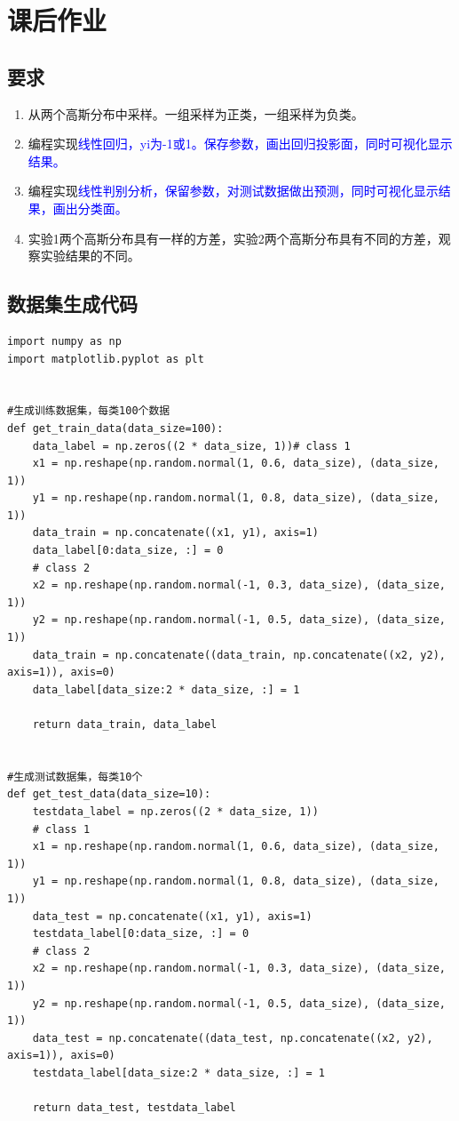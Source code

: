 \documentclass{article}
\date{\today}
\begin{document}
\section*{课后作业} %
\label{sec:课后作业}
\subsection*{要求} %
\label{sub:要求}
	\begin{enumerate}
		\item 从两个高斯分布中采样。一组采样为正类，一组采样为负类。
		\item 编程实现\textcolor{blue}{线性回归，yi为-1或1。保存参数，画出回归投影面，同时可视化显示结果。}
		\item 编程实现\textcolor{blue}{线性判别分析，保留参数，对测试数据做出预测，同时可视化显示结果，画出分类面。}
		\item 实验1两个高斯分布具有一样的方差，实验2两个高斯分布具有不同的方差，观察实验结果的不同。
	\end{enumerate}
\subsection*{数据集生成代码} %
\label{sub:数据集生成代码}
\begin{verbatim}
import numpy as np
import matplotlib.pyplot as plt


#生成训练数据集，每类100个数据
def get_train_data(data_size=100):
	data_label = np.zeros((2 * data_size, 1))# class 1
	x1 = np.reshape(np.random.normal(1, 0.6, data_size), (data_size, 1))
	y1 = np.reshape(np.random.normal(1, 0.8, data_size), (data_size, 1))
	data_train = np.concatenate((x1, y1), axis=1)
	data_label[0:data_size, :] = 0
	# class 2
	x2 = np.reshape(np.random.normal(-1, 0.3, data_size), (data_size, 1))
	y2 = np.reshape(np.random.normal(-1, 0.5, data_size), (data_size, 1))
	data_train = np.concatenate((data_train, np.concatenate((x2, y2), axis=1)), axis=0)
	data_label[data_size:2 * data_size, :] = 1
	
	return data_train, data_label


#生成测试数据集，每类10个
def get_test_data(data_size=10):
	testdata_label = np.zeros((2 * data_size, 1))
	# class 1
	x1 = np.reshape(np.random.normal(1, 0.6, data_size), (data_size, 1))
	y1 = np.reshape(np.random.normal(1, 0.8, data_size), (data_size, 1))
	data_test = np.concatenate((x1, y1), axis=1)
	testdata_label[0:data_size, :] = 0
	# class 2
	x2 = np.reshape(np.random.normal(-1, 0.3, data_size), (data_size, 1))
	y2 = np.reshape(np.random.normal(-1, 0.5, data_size), (data_size, 1))
	data_test = np.concatenate((data_test, np.concatenate((x2, y2), axis=1)), axis=0)
	testdata_label[data_size:2 * data_size, :] = 1
	
	return data_test, testdata_label
\end{verbatim}    
\end{document}
